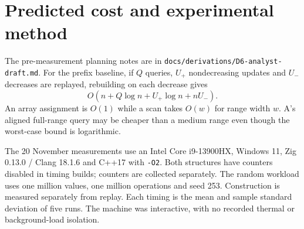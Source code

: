 \documentclass[11pt,a4paper]{article}
\begin{document}
\section{Predicted cost and experimental method}
The pre-measurement planning notes are in \texttt{docs/derivations/D6-analyst-draft.md}. For the prefix baseline, if $Q$ queries, $U_+$ nondecreasing updates and $U_-$ decreases are replayed, rebuilding on each decrease gives
\[O(n+Q\log n+U_+\log n+nU_-).\]
An array assignment is $O(1)$ while a scan takes $O(w)$ for range width $w$. A's aligned full-range query may be cheaper than a medium range even though the worst-case bound is logarithmic.

The 20 November measurements use an Intel Core i9-13900HX, Windows 11, Zig 0.13.0 / Clang 18.1.6 and C++17 with \texttt{-O2}. Both structures have counters disabled in timing builds; counters are collected separately. The random workload uses one million values, one million operations and seed 253. Construction is measured separately from replay. Each timing is the mean and sample standard deviation of five runs. The machine was interactive, with no recorded thermal or background-load isolation.
\end{document}
